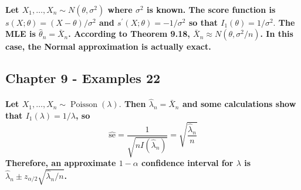 \documentclass{article}
\begin{document}
\paragraph{Let $X_{1}, \ldots, X_{n} \sim N\left(\theta, \sigma^{2}\right)$ where $\sigma^{2}$ is known. The score function is $s(X ; \theta)=(X-\theta) / \sigma^{2}$ and $s^{\prime}(X ; \theta)=-1 / \sigma^{2}$ so that $I_{1}(\theta)=1 / \sigma^{2} .$ The MLE is $\widehat{\theta}_{n}=\bar{X}_{n}$. According to Theorem 9.18, $\bar{X}_{n} \approx N\left(\theta, \sigma^{2} / n\right)$. In this case, the Normal approximation is actually exact.}

\subsection{Chapter 9 - Examples 22}
\paragraph{Let $X_{1}, \ldots, X_{n} \sim \operatorname{Poisson}(\lambda) .$ Then $\widehat{\lambda}_{n}=\bar{X}_{n}$ and some calculations show that $I_{1}(\lambda)=1 / \lambda$, so
$$
\widehat{\mathrm{se}}=\frac{1}{\sqrt{n I\left(\widehat{\lambda}_{n}\right)}}=\sqrt{\frac{\widehat{\lambda}_{n}}{n}}
$$
Therefore, an approximate $1-\alpha$ confidence interval for $\lambda$ is $\widehat{\lambda}_{n} \pm z_{\alpha / 2} \sqrt{\widehat{\lambda}_{n} / n}$.}
\end{document}
